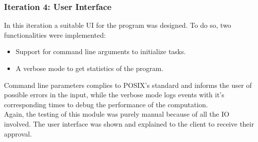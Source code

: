       \subsubsection{Iteration 4: User Interface}

      In this iteration a suitable UI for the program was designed. To do so,
      two functionalities were implemented:
      \begin{itemize}
        \item Support for command line arguments to initialize tasks.
        \item A verbose mode to get statistics of the program.
      \end{itemize}

      Command line parameters complies to POSIX's standard and informs the
      user of possible errors in the input, while the verbose mode logs events
      with it's corresponding times to debug the performance of the
      computation.\\

      Again, the testing of this module was purely manual because of all
      the IO involved. The user interface was shown and explained to the client
      to receive their approval.\\
